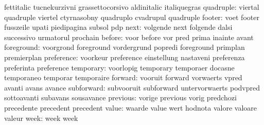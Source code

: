                            fettitalic                tucnekurzivni
                           grassettocorsivo          aldinitalic
                           italiquegras
                quadruple: viertal                   quadruple
                           viertel                   ctyrnasobny
                           quadruplo                 cvadrupul
                           quadruple
                   footer: voet                      footer
                           fusszeile                 upati
                           piedipagina               subsol
                           pdp
                     next: volgende                  next
                           folgende                  dalsi
                           successivo                urmatorul
                           prochain
                   before: voor                      before
                           vor                       pred
                           prima                     inainte
                           avant
               foreground: voorgrond                 foreground
                           vordergrund               popredi
                           foreground                primplan
                           premierplan
               preference: voorkeur                  preference
                           einstellung               nastaveni
                           preferenza                preferinta
                           preference
                temporary: voorlopig                 temporary
                           temporaer                 docasne
                           temporaneo                temporar
                           temporaire
                  forward: vooruit                   forward
                           vorwaerts                 vpred
                           avanti                    avans
                           avance
               subforward: subvooruit                subforward
                           untervorwaerts            podvpred
                           sottoavanti               subavans
                           sousavance
                 previous: vorige                    previous
                           vorig                     predchozi
                           precedente                precedent
                           precedent
                    value: waarde                    value
                           wert                      hodnota
                           valore                    valoare
                           valeur
                     week: week                      week
